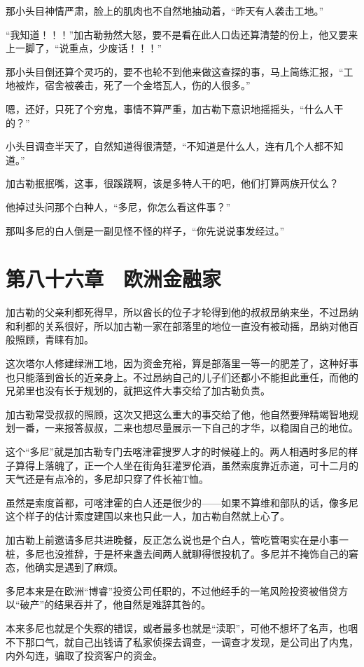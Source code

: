 那小头目神情严肃，脸上的肌肉也不自然地抽动着，“昨天有人袭击工地。”

“我知道！！！”加古勒勃然大怒，要不是看在此人口齿还算清楚的份上，他又要来上一脚了，“说重点，少废话！！！”

那小头目倒还算个灵巧的，要不也轮不到他来做这查探的事，马上简练汇报，“工地被炸，宿舍被袭击，死了一个金塔瓦人，伤的人很多。”

嗯，还好，只死了个穷鬼，事情不算严重，加古勒下意识地摇摇头，“什么人干的？”

小头目调查半天了，自然知道得很清楚，“不知道是什么人，连有几个人都不知道。”

加古勒抿抿嘴，这事，很蹊跷啊，该是多特人干的吧，他们打算两族开仗么？

他掉过头问那个白种人，“多尼，你怎么看这件事？”

那叫多尼的白人倒是一副见怪不怪的样子，“你先说说事发经过。”

\section{第八十六章　欧洲金融家}

加古勒的父亲利都死得早，所以酋长的位子才轮得到他的叔叔昂纳来坐，不过昂纳和利都的关系很好，所以加古勒一家在部落里的地位一直没有被动摇，昂纳对他百般照顾，青睐有加。

这次塔尔人修建绿洲工地，因为资金充裕，算是部落里一等一的肥差了，这种好事也只能落到酋长的近亲身上。不过昂纳自己的儿子们还都小不能担此重任，而他的兄弟里也没有长于规划的，就把这件大事交给了加古勒负责。

加古勒常受叔叔的照顾，这次又把这么重大的事交给了他，他自然要殚精竭智地规划一番，一来报答叔叔，二来也想尽量展示一下自己的才华，以稳固自己的地位。

这个“多尼”就是加古勒专门去喀津霍搜罗人才的时候碰上的。两人相遇时多尼的样子算得上落魄了，正一个人坐在街角狂灌罗伦酒，虽然索度靠近赤道，可十二月的天气还是有点冷的，多尼却只穿了件长袖T恤。

虽然是索度首都，可喀津霍的白人还是很少的——如果不算维和部队的话，像多尼这个样子的估计索度建国以来也只此一人，加古勒自然就上心了。

加古勒上前邀请多尼共进晚餐，反正怎么说也是个白人，管吃管喝实在是小事一桩，多尼也没推辞，于是杯来盏去间两人就聊得很投机了。多尼并不掩饰自己的窘态，他确实是遇到了麻烦。

多尼本来是在欧洲“博睿”投资公司任职的，不过他经手的一笔风险投资被借贷方以“破产”的结果吞并了，他自然是难辞其咎的。

本来多尼也就是个失察的错误，或者最多也就是“渎职”，可他不想坏了名声，也咽不下那口气，就自己出钱请了私家侦探去调查，一调查才发现，是公司出了内鬼，内外勾连，骗取了投资客户的资金。

